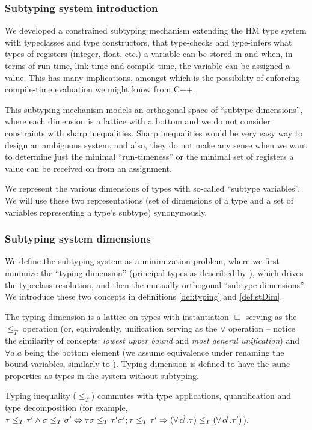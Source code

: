 \subsubsection{Subtyping system introduction}

We developed a constrained subtyping mechanism extending the HM type system with typeclasses and type constructors, that type-checks and type-infers what types of registers (integer, float, etc.) a variable can be stored in and when, in terms of run-time, link-time and compile-time, the variable can be assigned a value. This has many implications, amongst which is the possibility of enforcing compile-time evaluation we might know from C++.

This subtyping mechanism models an orthogonal space of ``subtype dimensions'', where each dimension is a lattice with a bottom and we do not consider constraints with sharp inequalities. Sharp inequalities would be very easy way to design an ambiguous system, and also, they do not make any sense when we want to determine just the minimal ``run-timeness'' or the minimal set of registers a value can be received on from an assignment.

We represent the various dimensions of types with so-called ``subtype variables''. We will use these two representations (set of dimensions of a type and a set of variables representing a type's subtype) synonymously.

\subsubsection{Subtyping system dimensions}

We define the subtyping system as a minimization problem, where we first minimize the ``typing dimension'' (principal types as described by \citet{damas1982principal}), which drives the typeclass resolution, and then the mutually orthogonal ``subtype dimensions''. We introduce these two concepts in definitions \ref{def:typing} and \ref{def:stDim}.

\begin{defn}
    \label{def:typing}
    The typing dimension is a lattice on types with instantiation $\sqsubseteq$ serving as the $\leq_T$ operation (or, equivalently, unification serving as the $\lor$ operation -- notice the similarity of concepts: \emph{lowest upper bound} and \emph{most general unification}) and $\forall a . a$ being the bottom element (we assume equivalence under renaming the bound variables, similarly to \citet{barendregt1992lambda}). Typing dimension is defined to have the same properties as types in the system without subtyping.

    Typing inequality ($\leq_T$) commutes with type applications, quantification and type decomposition (for example, $\tau \leq_T \tau' \land \sigma \leq_T \sigma' \Leftrightarrow \tau \sigma \leq_T \tau' \sigma'; \tau \leq_T \tau' \Rightarrow (\forall \overrightarrow{\alpha} . \tau) \leq_T (\forall \overrightarrow{\alpha} . \tau')$).

\end{defn}


